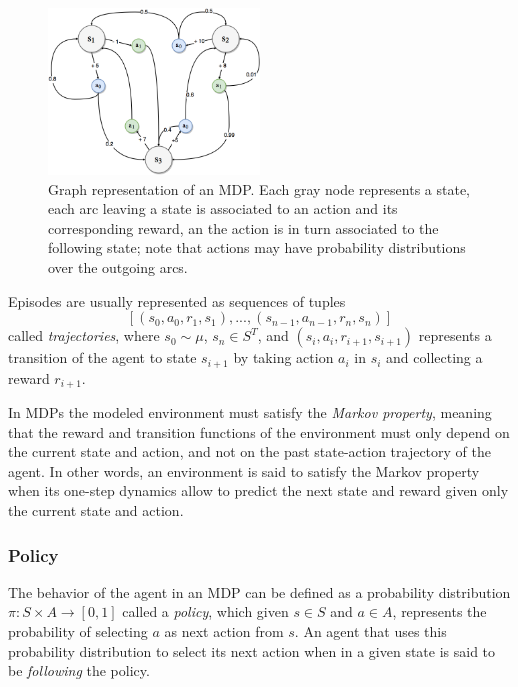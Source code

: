 \begin{figure}
    \includegraphics[width=0.5\textwidth]{pictures/mdp}
    \centering
    \caption[Graph representation of an MDP]{Graph representation of an MDP. 
	    Each gray node represents a state, each arc leaving a state is 
	    associated to an action and its corresponding reward, an the action 
	    is in turn associated to the following state; note that actions may 
	    have probability distributions over the outgoing arcs.}
    \label{f:mdp_graph}
\end{figure}
%

Episodes are usually represented as sequences of tuples 
\[
    [(s_0, a_0, r_1, s_1), ..., (s_{n-1}, a_{n-1}, r_n, s_n)]
\]
called \textit{trajectories}, where $s_0 \sim \mu$, $s_n \in S^T$, and 
$(s_i, a_i, r_{i+1}, s_{i+1})$ represents a transition of the agent to state 
$s_{i+1}$ by taking action $a_i$ in $s_i$ and collecting a reward $r_{i+1}$.

In MDPs the modeled environment must satisfy the \textit{Markov property}, 
meaning that the reward and transition functions of the environment must only 
depend on the current state and action, and not on the past state-action 
trajectory of the agent.
In other words, an environment is said to satisfy the Markov property when its 
one-step dynamics allow to predict the next state and reward given only the 
current state and action.

\subsubsection{Policy} \label{s:policies}
The behavior of the agent in an MDP can be defined as a probability 
distribution $\pi: S \times A \rightarrow [0,1]$ called a \textit{policy}, 
which given $s \in S$ and $a \in A$, represents the probability of selecting $a$
as next action from $s$.
An agent that uses this probability distribution to select its next action 
when in a given state is said to be \textit{following} the policy.

